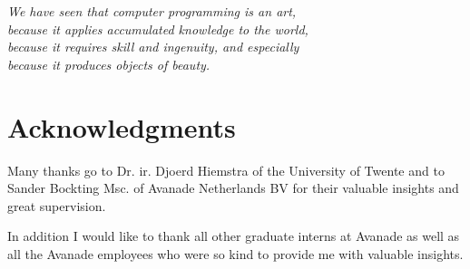 
\begin{flushright}{\slshape    
    We have seen that computer programming is an art, \\ 
    because it applies accumulated knowledge to the world, \\ 
    because it requires skill and ingenuity, and especially \\
    because it produces objects of beauty.} \\ \medskip
\end{flushright}



\bigskip

\begingroup
\let\clearpage\relax
\let\cleardoublepage\relax
\let\cleardoublepage\relax
\chapter*{Acknowledgments}
Many thanks go to Dr. ir. Djoerd Hiemstra of the University of Twente and to Sander Bockting Msc. of Avanade Netherlands BV for their valuable insights and great supervision.

In addition I would like to thank all other graduate interns at Avanade as well as all the Avanade employees who were so kind to provide me with valuable insights.

\endgroup



